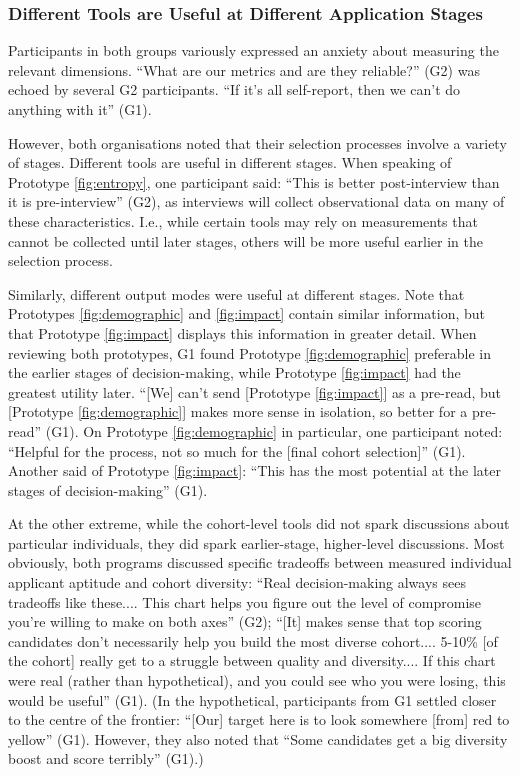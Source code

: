 \subsubsection{Different Tools are Useful at Different Application Stages}
Participants in both groups variously expressed an anxiety about measuring the relevant dimensions. ``What are our metrics and are they reliable?'' (G2) was echoed by several G2 participants. ``If it's all self-report, then we can't do anything with it'' (G1). 

However, both organisations noted that their selection processes involve a variety of stages. Different tools are useful in different stages. When speaking of Prototype \ref{fig:entropy}, one participant said: ``This is better post-interview than it is pre-interview'' (G2), as interviews will collect observational data on many of these characteristics. I.e., while certain tools may rely on measurements that cannot be collected until later stages, others will be more useful earlier in the selection process.

Similarly, different output modes were useful at different stages. Note that Prototypes \ref{fig:demographic} and \ref{fig:impact} contain similar information, but that Prototype \ref{fig:impact} displays this information in greater detail. When reviewing both prototypes, G1 found Prototype \ref{fig:demographic} preferable in the earlier stages of decision-making, while Prototype \ref{fig:impact} had the greatest utility later. ``[We] can't send [Prototype \ref{fig:impact}] as a pre-read, but [Prototype \ref{fig:demographic}] makes more sense in isolation, so better for a pre-read'' (G1). On Prototype \ref{fig:demographic} in particular, one participant noted: ``Helpful for the process, not so much for the [final cohort selection]'' (G1). Another said of Prototype \ref{fig:impact}: ``This has the most potential at the later stages of decision-making'' (G1).

At the other extreme, while the cohort-level tools did not spark discussions about particular individuals, they did spark earlier-stage, higher-level discussions. Most obviously, both programs discussed specific tradeoffs between measured individual applicant aptitude and cohort diversity: ``Real decision-making always sees tradeoffs like these.... This chart helps you figure out the level of compromise you're willing to make on both axes'' (G2); ``[It] makes sense that top scoring candidates don't necessarily help you build the most diverse cohort.... 5-10\% [of the cohort] really get to a struggle between quality and diversity.... If this chart were real (rather than hypothetical), and you could see who you were losing, this would be useful'' (G1). (In the hypothetical,  participants from G1 settled closer to the centre of the frontier: ``[Our] target here is to look somewhere [from] red to yellow'' (G1). However, they also noted that ``Some candidates get a big diversity boost and score terribly'' (G1).)

